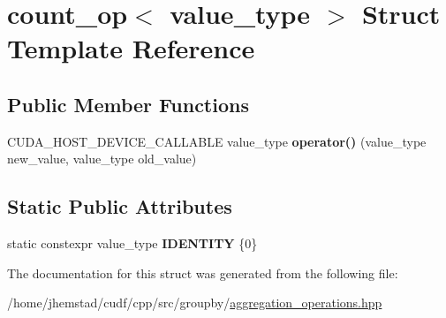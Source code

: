 \hypertarget{structcount__op}{}\section{count\+\_\+op$<$ value\+\_\+type $>$ Struct Template Reference}
\label{structcount__op}
\subsection*{Public Member Functions}
\begin{DoxyCompactItemize}
\item 
C\+U\+D\+A\+\_\+\+H\+O\+S\+T\+\_\+\+D\+E\+V\+I\+C\+E\+\_\+\+C\+A\+L\+L\+A\+B\+LE value\+\_\+type {\bfseries operator()} (value\+\_\+type new\+\_\+value, value\+\_\+type old\+\_\+value)\hypertarget{structcount__op_a842bdc4eef136cd1e9ed2277a22c5ab6}{}\label{structcount__op_a842bdc4eef136cd1e9ed2277a22c5ab6}

\end{DoxyCompactItemize}
\subsection*{Static Public Attributes}
\begin{DoxyCompactItemize}
\item 
static constexpr value\+\_\+type {\bfseries I\+D\+E\+N\+T\+I\+TY} \{0\}\hypertarget{structcount__op_a1bcfbbaa446e6ac9a2a393476165c513}{}\label{structcount__op_a1bcfbbaa446e6ac9a2a393476165c513}

\end{DoxyCompactItemize}


The documentation for this struct was generated from the following file\+:\begin{DoxyCompactItemize}
\item 
/home/jhemstad/cudf/cpp/src/groupby/\hyperlink{aggregation__operations_8hpp}{aggregation\+\_\+operations.\+hpp}\end{DoxyCompactItemize}
